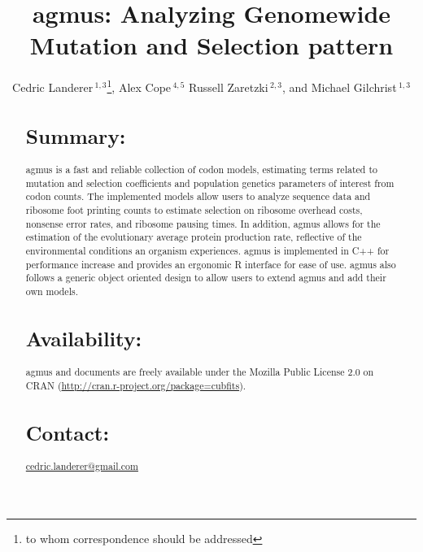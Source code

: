 \documentclass{bioinfo}
\newcommand{\pkg}[1]{{\fontseries{b}\selectfont #1}}
\newcommand{\package}{agmus } %
\begin{document}

\title[agmus]{agmus: Analyzing Genomewide Mutation and Selection pattern}
\author[
Landerer \textit{et~al}]{Cedric Landerer\,$^{1,3}$\footnote{
to whom correspondence should be addressed
},
Alex Cope\,$^{4,5}$
Russell Zaretzki\,$^{2,3}$, and
Michael Gilchrist\,$^{1,3}$
}
\address{$^{1}$
Department of Ecology and Evolutionary Biology,
$^{2}$Department of Statistics, Operations, and Management Science, and
$^{3}$National Institute for Mathematical and Biological Synthesis,
University of Tennessee, Knoxville, TN, USA,
$^{4}$Genome Science and Technology, University of Tennessee, Knoxville, TN, USA
$^{5}$Oak Ridge National Labratory, Oak Ridge, TN, USA} 


\maketitle

\begin{abstract}

\section{Summary:}
\pkg{\package} is a fast and reliable collection of codon models, estimating terms related to mutation and selection coefficients and population genetics parameters of interest from codon counts. 
The implemented models allow users to analyze sequence data and ribosome foot printing counts to estimate selection on ribosome overhead costs, nonsense error rates, and ribosome pausing times. 
In addition, \package allows for the estimation of the evolutionary average protein production rate, reflective of the environmental conditions an organism experiences. 
\package is implemented in C++ for performance increase and provides an ergonomic R interface for ease of use. 
\package also follows a generic object oriented design to allow users to extend \package and add their own models.

\section{Availability:}
\pkg{\package} and documents are freely available under the Mozilla Public License 2.0
on CRAN (\url{http://cran.r-project.org/package=cubfits}).

\section{Contact:} \href{cedric.landerer@gmail.com}{cedric.landerer@gmail.com}
\end{abstract}
\end{document}

